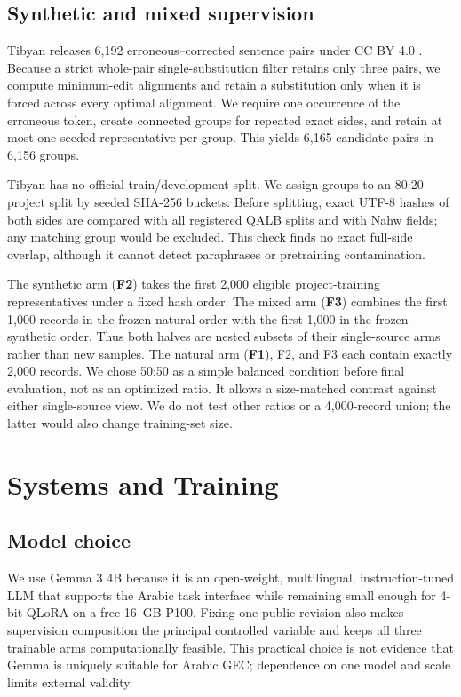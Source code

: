 \documentclass[11pt,a4paper]{article}
\begin{document}
\subsection{Synthetic and mixed supervision}

Tibyan releases 6,192 erroneous--corrected sentence pairs under CC BY 4.0
\citep{alrehili-alhothali-2024-tibyan}.  Because a strict whole-pair
single-substitution filter retains only three pairs, we compute minimum-edit
alignments and retain a substitution only when it is forced across every
optimal alignment.  We require one occurrence of the erroneous token, create
connected groups for repeated exact sides, and retain at most one seeded
representative per group.  This yields 6,165 candidate pairs in 6,156 groups.

Tibyan has no official train/development split.  We assign groups to an
80:20 project split by seeded SHA-256 buckets.  Before splitting, exact
UTF-8 hashes of both sides are compared with all registered QALB splits and
with Nahw fields; any matching group would be excluded.  This check finds no
exact full-side overlap, although it cannot detect paraphrases or pretraining
contamination.

The synthetic arm (\textbf{F2}) takes the first 2,000 eligible project-training
representatives under a fixed hash order.  The mixed arm (\textbf{F3}) combines
the first 1,000 records in the frozen natural order with the first 1,000 in the
frozen synthetic order.  Thus both halves are nested subsets of their
single-source arms rather than new samples.  The natural arm (\textbf{F1}),
F2, and F3 each contain exactly 2,000 records.  We chose 50:50 as a simple
balanced condition before final evaluation, not as an optimized ratio.  It
allows a size-matched contrast against either single-source view.  We do not
test other ratios or a 4,000-record union; the latter would also change
training-set size.

\section{Systems and Training}

\subsection{Model choice}

We use Gemma 3 4B because it is an open-weight, multilingual,
instruction-tuned LLM that supports the Arabic task interface while remaining
small enough for 4-bit QLoRA on a free 16~GB P100.  Fixing one public revision
also makes supervision composition the principal controlled variable and keeps
all three trainable arms computationally feasible.  This practical choice is
not evidence that Gemma is uniquely suitable for Arabic GEC; dependence on one
model and scale limits external validity.
\end{document}
